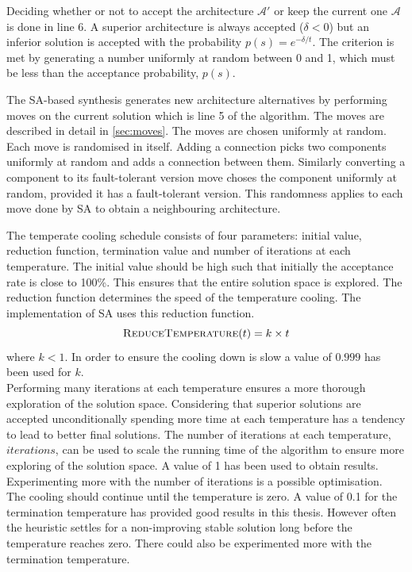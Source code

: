 Deciding whether or not to accept the architecture $\mathcal{A}'$ or keep the current one $\mathcal{A}$ is done in line 6. A superior architecture is always accepted ($\delta < 0$) but an inferior solution is accepted with the probability $p(s) = e^{-\delta / t}$. The criterion is met by generating a number uniformly at random between 0 and 1, which must be less than the acceptance probability, $p(s)$.

The SA-based synthesis generates new architecture alternatives by performing moves on the current solution which is line 5 of the algorithm. The moves are described in detail in \autoref{sec:moves}. The moves are chosen uniformly at random. Each move is randomised in itself. Adding a connection picks two components uniformly at random and adds a connection between them. Similarly converting a component to its fault-tolerant version move choses the component uniformly at random, provided it has a fault-tolerant version. This randomness applies to each move done by SA to obtain a neighbouring architecture.

The temperate cooling schedule consists of four parameters: initial value, reduction function, termination value and number of iterations at each temperature. The initial value should be high such that initially the acceptance rate is close to 100\%. This ensures that the entire solution space is explored. The reduction function determines the speed of the temperature cooling. The implementation of SA uses this reduction function.
$$\Call{ReduceTemperature}{t} = k \times t$$
where $k < 1$. In order to ensure the cooling down is slow a value of $0.999$ has been used for $k$.\\
Performing many iterations at each temperature ensures a more thorough exploration of the solution space. Considering that superior solutions are accepted unconditionally spending more time at each temperature has a tendency to lead to better final solutions. The number of iterations at each temperature, $iterations$, can be used to scale the running time of the algorithm to ensure more exploring of the solution space. A value of 1 has been used to obtain results. Experimenting more with the number of iterations is a possible optimisation.\\
The cooling should continue until the temperature is zero. A value of 0.1 for the termination temperature has provided good results in this thesis. However often the heuristic settles for a non-improving stable solution long before the temperature reaches zero. There could also be experimented more with the termination temperature.

